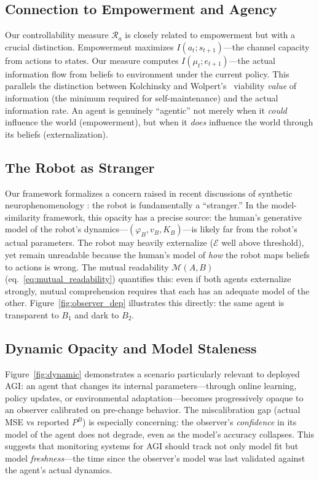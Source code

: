 \documentclass[runningheads]{llncs}
\begin{document}
\subsection{Connection to Empowerment and Agency}

Our controllability measure $\mathcal{R}_a$ is closely related to empowerment \cite{klyubin2005empowerment} but with a crucial distinction. Empowerment maximizes $I(a_t; s_{t+1})$---the channel capacity from actions to states. Our measure computes $I(\mu_t; e_{t+1})$---the actual information flow from beliefs to environment under the current policy. This parallels the distinction between Kolchinsky and Wolpert's~\cite{kolchinsky2018semantic} viability \emph{value} of information (the minimum required for self-maintenance) and the actual information rate. An agent is genuinely ``agentic'' not merely when it \emph{could} influence the world (empowerment), but when it \emph{does} influence the world through its beliefs (externalization).

\subsection{The Robot as Stranger}

Our framework formalizes a concern raised in recent discussions of synthetic neurophenomenology \cite{monnier2025generative}: the robot is fundamentally a ``stranger.'' In the model-similarity framework, this opacity has a precise source: the human's generative model of the robot's dynamics---$(\varphi_B, v_B, K_B)$---is likely far from the robot's actual parameters. The robot may heavily externalize ($\mathcal{E}$ well above threshold), yet remain unreadable because the human's model of \emph{how} the robot maps beliefs to actions is wrong. The mutual readability $\mathcal{M}(A, B)$ (eq.~\ref{eq:mutual_readability}) quantifies this: even if both agents externalize strongly, mutual comprehension requires that each has an adequate model of the other. Figure~\ref{fig:observer_dep} illustrates this directly: the same agent is transparent to $B_1$ and dark to $B_2$.

\subsection{Dynamic Opacity and Model Staleness}

Figure~\ref{fig:dynamic} demonstrates a scenario particularly relevant to deployed AGI: an agent that changes its internal parameters---through online learning, policy updates, or environmental adaptation---becomes progressively opaque to an observer calibrated on pre-change behavior. The miscalibration gap (actual MSE vs reported $P^B$) is especially concerning: the observer's \emph{confidence} in its model of the agent does not degrade, even as the model's accuracy collapses. This suggests that monitoring systems for AGI should track not only model fit but model \emph{freshness}---the time since the observer's model was last validated against the agent's actual dynamics.
\end{document}
